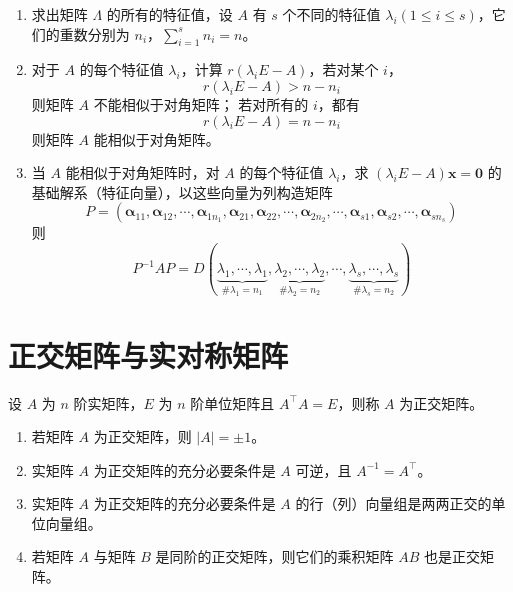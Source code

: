 \documentclass{ctexbook}
\begin{document}
\begin{proposition}[求相似对角矩阵]
    \begin{enumerate}
        \item 求出矩阵 $\Lambda$ 的所有的特征值，设 $A$ 有 $s$ 个不同的特征值 $\lambda_i (1\leq i\leq s)$，它们的重数分别为 $n_i$，$\sum_{i=1}^s n_i=n$。
        \item 对于 $A$ 的每个特征值 $\lambda_i$，计算 $r(\lambda_i E-A)$，若对某个 $i$，
        \begin{equation}
            r(\lambda_i E-A)>n-n_i
        \end{equation}
        则矩阵 $A$ 不能相似于对角矩阵；
        若对所有的 $i$，都有
        \begin{equation}
            r(\lambda_iE-A)=n-n_i
        \end{equation}
        则矩阵 $A$ 能相似于对角矩阵。
        \item 当 $A$ 能相似于对角矩阵时，对 $A$ 的每个特征值 $\lambda_i$，求 $(\lambda_iE-A)\boldsymbol{x}=\boldsymbol{0}$ 的基础解系（特征向量），以这些向量为列构造矩阵
        \begin{equation}
            P=(\boldsymbol{\alpha}_{11},\boldsymbol{\alpha}_{12},\cdots,\boldsymbol{\alpha}_{1n_1},\boldsymbol{\alpha}_{21},\boldsymbol{\alpha}_{22},\cdots,\boldsymbol{\alpha}_{2n_2},\cdots,\boldsymbol{\alpha}_{s1},\boldsymbol{\alpha}_{s2},\cdots,\boldsymbol{\alpha}_{sn_s})
        \end{equation}
        则
        \begin{equation}
            P^{-1}AP=D(\underbrace{\lambda_1,\cdots,\lambda_1}_{\#\lambda_1=n_1},\underbrace{\lambda_2,\cdots,\lambda_2}_{\#\lambda_2=n_2},\cdots,\underbrace{\lambda_s,\cdots,\lambda_s}_{\#\lambda_s=n_2})
        \end{equation}
    \end{enumerate}
\end{proposition}

\section{正交矩阵与实对称矩阵}

\begin{definition}[正交矩阵]
    设 $A$ 为 $n$ 阶实矩阵，$E$ 为 $n$ 阶单位矩阵且 $A^\top A=E$，则称 $A$ 为正交矩阵。
\end{definition}

\begin{proposition}[正交矩阵的性质]
    \begin{enumerate}
        \item 若矩阵 $A$ 为正交矩阵，则 $|A|=\pm 1$。
        \item 实矩阵 $A$ 为正交矩阵的充分必要条件是 $A$ 可逆，且 $A^{-1}=A^\top$。
        \item 实矩阵 $A$ 为正交矩阵的充分必要条件是 $A$ 的行（列）向量组是两两正交的单位向量组。
        \item 若矩阵 $A$ 与矩阵 $B$ 是同阶的正交矩阵，则它们的乘积矩阵 $AB$ 也是正交矩阵。
    \end{enumerate}
\end{proposition}
\end{document}
